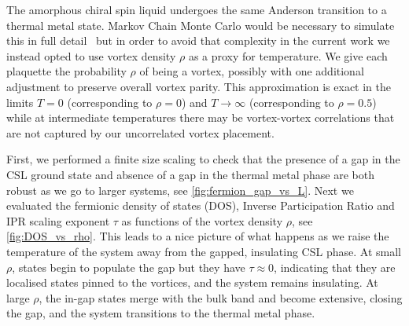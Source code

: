 The amorphous chiral spin liquid undergoes the same Anderson transition to a thermal metal state. Markov Chain Monte Carlo would be necessary to simulate this in full detail~\autocite{selfThermallyInducedMetallic2019} but in order to avoid that complexity in the current work we instead opted to use vortex density \(\rho\) as a proxy for temperature. We give each plaquette the probability \(\rho\) of being a vortex, possibly with one additional adjustment to preserve overall vortex parity. This approximation is exact in the limits \(T = 0\) (corresponding to \(\rho = 0\)) and \(T \to \infty\) (corresponding to \(\rho = 0.5\)) while at intermediate temperatures there may be vortex-vortex correlations that are not captured by our uncorrelated vortex placement.

First, we performed a finite size scaling to check that the presence of a gap in the CSL ground state and absence of a gap in the thermal metal phase are both robust as we go to larger systems, see \cref{fig:fermion_gap_vs_L}. Next we evaluated the fermionic density of states (DOS), Inverse Participation Ratio and IPR scaling exponent \(\tau\) as functions of the vortex density \(\rho\), see \cref{fig:DOS_vs_rho}. This leads to a nice picture of what happens as we raise the temperature of the system away from the gapped, insulating CSL phase. At small \(\rho\), states begin to populate the gap but they have \(\tau\approx0\), indicating that they are localised states pinned to the vortices, and the system remains insulating. At large \(\rho\), the in-gap states merge with the bulk band and become extensive, closing the gap, and the system transitions to the thermal metal phase.

